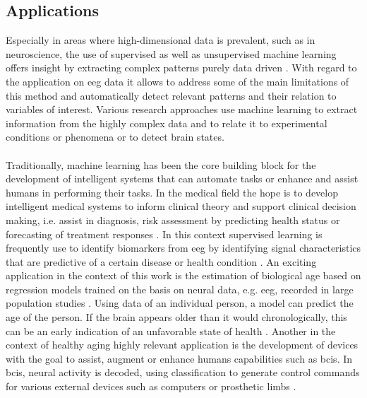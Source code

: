 \subsection{Applications}
Especially in areas where high-dimensional data is prevalent, such as in neuroscience, the use of supervised as well as unsupervised machine learning offers insight by extracting complex patterns purely data driven \cite{Bzdok2017}. With regard to the application on \gls{eeg} data it allows to address some of the main limitations of this method and automatically detect relevant patterns and their relation to variables of interest. Various research approaches use machine learning to extract information from the highly complex data and to relate it to experimental conditions or phenomena or to detect brain states.\\
\\
Traditionally, machine learning has been the core building block for the development of intelligent systems that can automate tasks or enhance and assist humans in performing their tasks. In the medical field the hope is to develop intelligent medical systems to inform clinical theory and support clinical decision making, i.e. assist in diagnosis, risk assessment by predicting health status or forecasting of treatment responses \cite{Woo2017}. In this context supervised learning is frequently use to identify biomarkers from \gls{eeg} by identifying signal characteristics that are predictive of a certain disease or health condition \cite{Babiloni_AlzCons2021,Mei2021}. An exciting application in the context of this work is the estimation of biological age based on regression models trained on the basis on neural data, e.g. \gls{eeg}, recorded in large population studies \cite{Engemann2022}. Using data of an individual person, a model can predict the age of the person. If the brain appears older than it would chronologically, this can be an early indication of an unfavorable state of health \cite{Gonneaud2021}. Another in the context of healthy aging highly relevant application is the development of devices with the goal to assist, augment or enhance humans capabilities such as \glspl{bci}. In \glspl{bci}, neural activity is decoded, using classification to generate control commands for various external devices such as computers or prosthetic limbs \cite{Saha2021, Anumanchipalli2019}.\\
